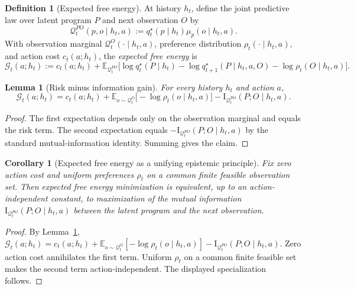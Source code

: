 \documentclass[11pt]{article}
\newtheorem{corollary}[theorem]{Corollary}
\newtheorem{lemma}[theorem]{Lemma}
\theoremstyle{definition}
\newtheorem{definition}[theorem]{Definition}
\theoremstyle{remark}
\newcommand{\Gcal}{\mathcal{G}}
\newcommand{\Qcal}{\mathcal{Q}}
\newcommand{\E}{\mathbb{E}}
\newcommand{\I}{\mathrm{I}}
\begin{document}
\begin{definition}[Expected free energy]
\label{def:efe}
At history $h_t$, define the joint predictive law over latent program $P$ and next observation $O$ by
\[
\Qcal_t^{PO}(p,o\mid h_t,a):=q_t^\star(p\mid h_t)\mu_p(o\mid h_t,a).
\]
With observation marginal $\Qcal_t^O(\cdot\mid h_t,a)$, preference distribution $\rho_t(\cdot\mid h_t,a)$, and action cost $c_t(a;h_t)$, the \emph{expected free energy} is
\[
\Gcal_t(a;h_t)
:=
c_t(a;h_t)
+
\E_{\Qcal_t^{PO}}\!\bigl[\log q_t^\star(P\mid h_t)-\log q_{t+1}^\star(P\mid h_t,a,O)-\log\rho_t(O\mid h_t,a)\bigr].
\]
\end{definition}

\begin{lemma}[Risk minus information gain]
\label{lem:risk-ig}
For every history $h_t$ and action $a$,
\[
\Gcal_t(a;h_t)
=
c_t(a;h_t)
+\E_{o\sim\Qcal_t^O}\bigl[-\log\rho_t(o\mid h_t,a)\bigr]
-\I_{\Qcal_t^{PO}}(P;O\mid h_t,a).
\]
\end{lemma}

\begin{proof}
The first expectation depends only on the observation marginal and equals the risk term. The second expectation equals $-\I_{\Qcal_t^{PO}}(P;O\mid h_t,a)$ by the standard mutual-information identity. Summing gives the claim.
\end{proof}

\begin{corollary}[Expected free energy as a unifying epistemic principle]
\label{cor:efe-specialization}
Fix zero action cost and uniform preferences $\rho_t$ on a common finite feasible observation set. Then expected free energy minimization is equivalent, up to an action-independent constant, to maximization of the mutual information $\I_{\Qcal_t^{PO}}(P;O\mid h_t,a)$ between the latent program and the next observation.
\end{corollary}

\begin{proof}
By Lemma~\ref{lem:risk-ig}, $\Gcal_t(a;h_t)=c_t(a;h_t)+\E_{o\sim\Qcal_t^O}[-\log\rho_t(o\mid h_t,a)]-\I_{\Qcal_t^{PO}}(P;O\mid h_t,a)$. Zero action cost annihilates the first term. Uniform $\rho_t$ on a common finite feasible set makes the second term action-independent. The displayed specialization follows.
\end{proof}
\end{document}
